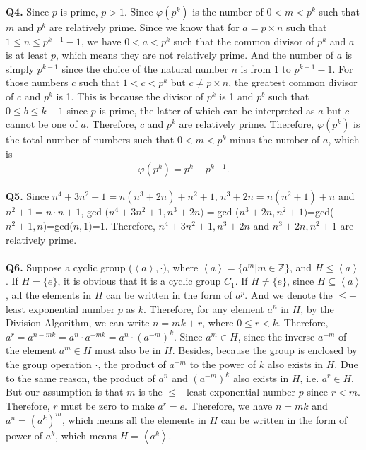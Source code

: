 \documentclass{article}[12pt]
\begin{document}
\noindent \textbf{Q4.}
Since $p$ is prime, $p>1$.
Since $\varphi(p^k)$ is the number of $0<m<p^k$ such that $m$ and $p^k$ are relatively prime. Since we know that for $a=p\times n$ such that $1\leq n\leq p^{k-1}-1$, we have $0<a<p^k$ such that the common divisor of $p^k$ and $a$ is at least $p$, which means they are not relatively prime. And the number of $a$ is simply $p^{k-1}$ since the choice of the natural number $n$ is from 1 to $p^{k-1}-1$. For those numbers $c$ such that $1<c<p^k$ but $c\not =p\times n$, the greatest common divisor of $c$ and $p^k$ is 1. This is because the divisor of $p^k$ is 1 and $p^b$ such that $0\leq b\leq k-1$ since $p$ is prime, the latter of which can be interpreted as $a$ but $c$ cannot be one of $a$. Therefore, $c$ and $p^k$ are relatively prime. Therefore, $\varphi(p^k)$ is the total number of numbers such that $0<m<p^k$ minus the number of $a$, which is 
\begin{align*}
\varphi\left(p^{k}\right)=p^{k}-p^{k-1}.
\end{align*}



\noindent \textbf{Q5.}
Since $n^{4}+3 n^{2}+1=n(n^3+2n)+n^2+1$, $n^3+2n=n(n^2+1)+n$ and $n^2+1=n\cdot n +1$, gcd ($n^{4}+3 n^{2}+1,n^3+2n)=$gcd ($n^3+2n,n^2+1)$=gcd($n^2+1,n$)=gcd($n,1)$=1.  Therefore, $n^{4}+3 n^{2}+1,n^3+2n $ and $n^3+2n,n^2+1$ are relatively prime.
\\ \\
\noindent \textbf{Q6.}
Suppose a cyclic group ($\left\langle a\right\rangle,\cdot)$, where $\left\langle a\right\rangle=\{a^m|m\in \mathbb{Z}\}$, and $H\leq \left\langle a\right\rangle$. If $H=\{e\}$, it is obvious that it is a cyclic group $C_1$. If $H\not=\{e\}$, since $H\subseteq \left\langle a\right\rangle$, all the elements in $H$ can be written in the form of $a^p$. And we denote the $\leq-$least exponential number $p$ as $k$. Therefore, for any element $a^n$ in $H$, by the Division Algorithm, we can write $n=mk+r$, where $0\leq r<k$. Therefore,  $a^r=a^{n-mk}=a^n\cdot a^{-mk}=a^n\cdot (a^{-m})^k$. Since $a^m\in H$, since the inverse $a^{-m}$ of the element $a^m\in H$ must also be in $H$. Besides, because the group is enclosed by the group operation $\cdot$, the product of $a^{-m}$ to the power of $k$ also exists in $H$. Due to the same reason, the product of $a^n$ and $(a^{-m})^k$ also exists in $H$, i.e. $a^r\in H$. But our assumption is that $m$ is the $\leq-$least exponential number $p$ since $r<m$. Therefore, $r$ must be zero to make $a^r=e$. Therefore, we have $n=mk$ and $a^n=(a^k)^m$, which means all the elements in $H$ can be written in the form of power of $a^k$, which means $H=\left\langle a^k \right\rangle$.\\
\end{document}
